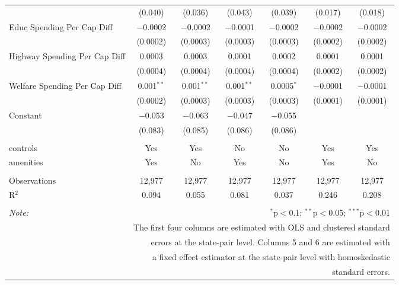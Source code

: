 \begin{table}[!htbp]
\begin{tabular}{@{\extracolsep{5pt}}lcccccc}
  & (0.040) & (0.036) & (0.043) & (0.039) & (0.017) & (0.018) \\ 
  Educ Spending Per Cap Diff & $-$0.0002 & $-$0.0002 & $-$0.0001 & $-$0.0002 & $-$0.0002 & $-$0.0002 \\ 
  & (0.0002) & (0.0003) & (0.0003) & (0.0003) & (0.0002) & (0.0002) \\ 
  Highway Spending Per Cap Diff & 0.0003 & 0.0003 & 0.0001 & 0.0002 & 0.0001 & 0.0001 \\ 
  & (0.0004) & (0.0004) & (0.0004) & (0.0004) & (0.0002) & (0.0002) \\ 
  Welfare Spending Per Cap Diff & 0.001$^{**}$ & 0.001$^{**}$ & 0.001$^{**}$ & 0.0005$^{*}$ & $-$0.0001 & $-$0.0001 \\ 
  & (0.0002) & (0.0003) & (0.0003) & (0.0003) & (0.0001) & (0.0001) \\ 
  Constant & $-$0.053 & $-$0.063 & $-$0.047 & $-$0.055 &  &  \\ 
  & (0.083) & (0.085) & (0.086) & (0.086) &  &  \\ 
 \hline \\[-1.8ex] 
controls & Yes & Yes & No & No & Yes & Yes \\ 
amenities & Yes & No & Yes & No & Yes & No \\ 
\hline \\[-1.8ex] 
Observations & 12,977 & 12,977 & 12,977 & 12,977 & 12,977 & 12,977 \\ 
R$^{2}$ & 0.094 & 0.055 & 0.081 & 0.037 & 0.246 & 0.208 \\ 
\hline 
\hline \\[-1.8ex] 
\textit{Note:}  & \multicolumn{6}{r}{$^{*}$p$<$0.1; $^{**}$p$<$0.05; $^{***}$p$<$0.01} \\ 
 & \multicolumn{6}{r}{The first four columns are estimated with OLS and clustered standard} \\ 
 & \multicolumn{6}{r}{ errors at the state-pair level. Columns 5 and 6 are estimated with} \\ 
 & \multicolumn{6}{r}{a fixed effect estimator at the state-pair level with homoskedastic} \\ 
 & \multicolumn{6}{r}{standard errors.} \\ 
\end{tabular} 
\end{table} 
